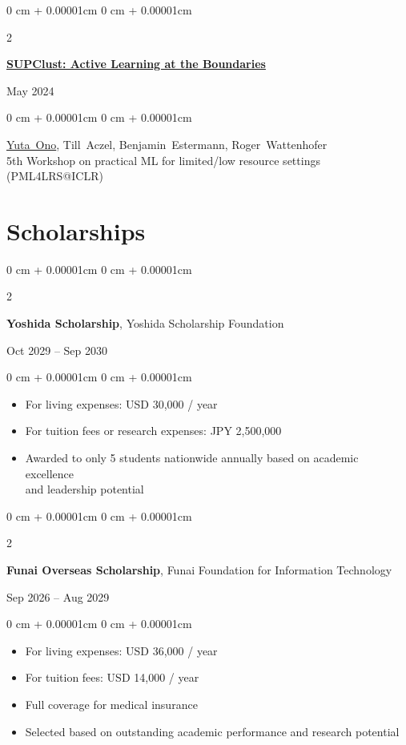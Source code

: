 \documentclass[11pt, letterpaper]{article}
\newenvironment{highlights}{
    \begin{itemize}[
        topsep=0.0cm,
        parsep=0.0cm,
        partopsep=0pt,
        itemsep=0pt,
        leftmargin=10pt
    ]
}{
    \end{itemize}
} %
\newenvironment{onecolentry}{
    \begin{adjustwidth}{
        0 cm + 0.00001cm
    }{
        0 cm + 0.00001cm
    }
}{
    \end{adjustwidth}
} %
\newenvironment{twocolentry}[2][]{
    \onecolentry
    \def\secondColumn{#2}
    \setcolumnwidth{\fill, 3.5cm}
    \begin{paracol}{2}
}{
    \switchcolumn \raggedleft \secondColumn
    \end{paracol}
    \endonecolentry
} %
\begin{document}
      \vspace{0.15 cm}
      \begin{samepage}
        \begin{twocolentry}{May 2024}
          \textbf{\href{https://arxiv.org/abs/2403.03741}{SUPClust: Active Learning at the Boundaries}}
        \end{twocolentry}
        \begin{onecolentry}
          \mbox{\underline{Yuta Ono}}, \mbox{Till Aczel}, \mbox{Benjamin Estermann}, \mbox{Roger Wattenhofer}\\
          5th Workshop on practical ML for limited/low resource settings (PML4LRS@ICLR)
        \end{onecolentry}
      \end{samepage}

    \section{Scholarships}
      \begin{samepage}
        \begin{twocolentry}{Oct 2029 -- Sep 2030}
          \textbf{Yoshida Scholarship}, Yoshida Scholarship Foundation
        \end{twocolentry}
        \vspace{0.05 cm}
        \begin{onecolentry}
          \begin{highlights}
            \item For living expenses: USD 30,000 / year
            \item For tuition fees or research expenses: JPY 2,500,000
            \item Awarded to only 5 students nationwide annually based on academic excellence \\and leadership potential
          \end{highlights}
        \end{onecolentry}
      \end{samepage}
      \vspace{0.30cm}
      \begin{samepage}
        \begin{twocolentry}{Sep 2026 -- Aug 2029}
          \textbf{Funai Overseas Scholarship}, Funai Foundation for Information Technology
        \end{twocolentry}
        \vspace{0.05 cm}
        \begin{onecolentry}
          \begin{highlights}
            \item For living expenses: USD 36,000 / year
            \item For tuition fees: USD 14,000 / year
            \item Full coverage for medical insurance
            \item Selected based on outstanding academic performance and research potential
          \end{highlights}
        \end{onecolentry}
      \end{samepage}
\end{document}
